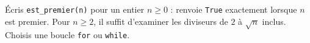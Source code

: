 Écris \texttt{est\_premier(n)} pour un entier $n\ge0$ : renvoie \texttt{True} exactement lorsque $n$ est premier. Pour $n\ge2$, il suffit d'examiner les diviseurs de $2$ à $\sqrt n$ inclus. Choisis une boucle \texttt{for} ou \texttt{while}.

